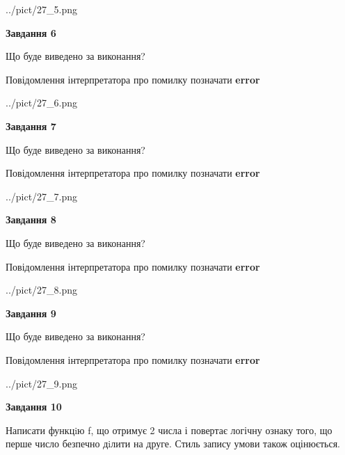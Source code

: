 \documentclass[12pt, ukrainian]{article}
\begin{document}
{\begin {large}
\begin{center}
	{../pict/27_5.png}
\end{center}
\newpage

{\begin {center}\textbf{Завдання 6}\end {center}}\par
Що буде виведено за виконання? \par
Повідомлення інтерпретатора про помилку позначати \textbf{error}

\begin{center}
	{../pict/27_6.png}
\end{center}
\newpage

{\begin {center}\textbf{Завдання 7}\end {center}}\par
Що буде виведено за виконання? \par
Повідомлення інтерпретатора про помилку позначати \textbf{error}

\begin{center}
	{../pict/27_7.png}
\end{center}
\newpage

{\begin {center}\textbf{Завдання 8}\end {center}}\par
Що буде виведено за виконання? \par
Повідомлення інтерпретатора про помилку позначати \textbf{error}

\begin{center}
	{../pict/27_8.png}
\end{center}
\newpage

{\begin {center}\textbf{Завдання 9}\end {center}}\par
Що буде виведено за виконання? \par
Повідомлення інтерпретатора про помилку позначати \textbf{error}

\begin{center}
	{../pict/27_9.png}
\end{center}
\newpage

{\begin {center}\textbf{Завдання 10}\end {center}}\par

Написати функцiю f, що отримує 2 числа і повертає логічну ознаку того, що перше число безпечно дiлити на друге. Стиль запису умови також оцінюється.\par
\newpage

\end {large}}
\end{document}
